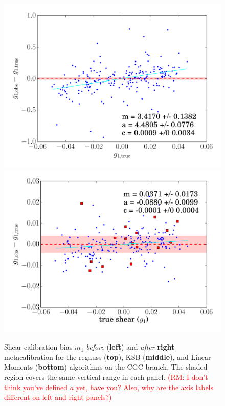 \documentclass[iop]{emulateapj}
\newcommand\rmcomment[1]{\textcolor{red}{(RM: #1)}}
\begin{document}
\begin{figure}[t]
\begin{center}
\includegraphics[width=0.46\linewidth]{./Plots/m1-no_corrections-moments.pdf}
\includegraphics[width=0.46\linewidth]{./Plots/m1-moments-opt-shear_plots.pdf}
\end{center}
\caption{Shear calibration bias $m_1$ {\it before} ({\bf left}) and
  {\it after} {\bf right} metacalibration for the regauss ({\bf top}),
  KSB ({\bf middle}), and Linear Moments ({\bf bottom}) algorithms on
  the CGC branch. The shaded region covers the same vertical range in
  each panel.  \rmcomment{I don't think you've defined $a$ yet, have you?  Also, why are the axis
    labels different on left and right panels?}}
\label{fig:m_comparison}
\end{figure}
\end{document}
